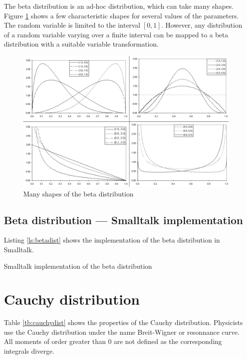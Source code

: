 \documentclass[twoside]{book}
\begin{document}
The beta distribution is an ad-hoc distribution, which can take
many shapes. Figure \ref{fig:betaDistr} shows a few characteristic
shapes for several values of the parameters. The random variable
is limited to the interval $\left[0,1\right]$. However, any
distribution of a random variable varying over a finite interval
can be mapped to a beta distribution with a suitable variable
transformation.
\begin{figure}
\centering\includegraphics[width=12cm]{Figures/BetaDistribution}
\caption{Many shapes of the beta
distribution}\label{fig:betaDistr}
\end{figure}


\subsection{Beta distribution --- Smalltalk  implementation}
Listing \ref{ls:betadist} shows the implementation of the beta
distribution in Smalltalk.

\begin{listing} Smalltalk implementation of the beta distribution \label{ls:betadist}

\end{listing}


\section{Cauchy distribution}
\label{sec:cauchydist} Table \ref{tb:cauchydist} shows the
properties of the Cauchy distribution. Physicists use the Cauchy
distribution under the name Breit-Wigner or resonnance curve. All
moments of order greater than 0 are not defined as the
corresponding integrals diverge.
\end{document}
